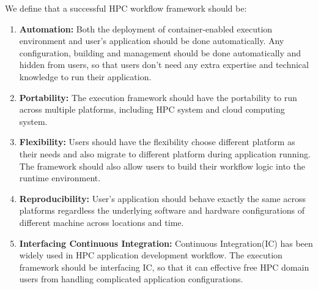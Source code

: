 \begin{comment}
\qguan{We may need to put some bullets to define what is needed for a successful workflow framework } \\
\qguan{For example  1. Automation  }\\
\qguan{2.Portability}\\
\qguan{3.Flexibility} \\
\qguan{4.Reproducibility}\\
\qguan{5.Interfacing Continuous Integration?}\\
\qguan{these requirements should be mapping to our contribution}
\end{comment}

We define that a successful HPC workflow framework should be:

\begin{enumerate}
\item \textbf{Automation:} 
Both the deployment of container-enabled execution environment and user's application should be done automatically. Any configuration, building and management should be done automatically and hidden from users, so that users don't need any extra expertise and technical knowledge to run their application. 
\item \textbf{Portability:}
The execution framework should have the portability to run across multiple platforms, including HPC system and cloud computing system.
\item \textbf{Flexibility:}
Users should have the flexibility choose different platform as their needs and also migrate to different platform during application running. The framework should also allow users to build their workflow logic into the runtime environment.
\item \textbf{Reproducibility:}
User's application should behave exactly the same across platforms regardless the underlying software and hardware configurations of different machine across locations and time.
\item \textbf{Interfacing Continuous Integration:}
Continuous Integration(IC) has been widely used in HPC application development workflow. The execution framework should be interfacing IC, so that it can effective free HPC domain users from handling complicated application configurations.  
\end{enumerate}



